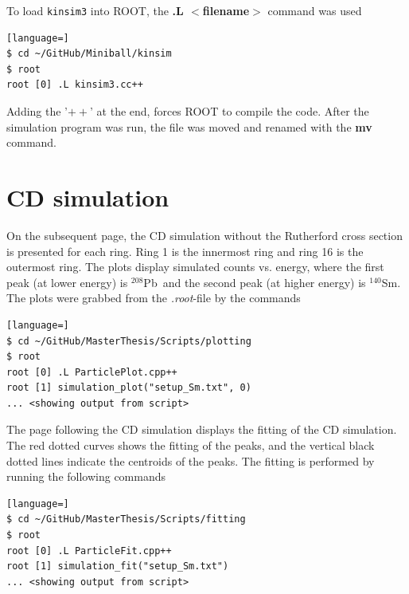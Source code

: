 \documentclass[twoside,english]{uiofysmaster/uiofysmaster}
\newcommand{\Sm}{$^{140}$Sm} %
\newcommand{\Pb}{$^{208}$Pb}
\begin{document}
\begin{appendices}
To load \texttt{kinsim3} into ROOT, the \textbf{.L $<$filename$>$} command was used
\begin{lstlisting}[language=]
$ cd ~/GitHub/Miniball/kinsim
$ root
root [0] .L kinsim3.cc++
\end{lstlisting}
Adding the '$++$' at the end, forces ROOT to compile the code. 
After the simulation program was run, the file was moved and renamed with the \textbf{mv} command. 


\section{CD simulation}
On the subsequent page, the CD simulation without the Rutherford cross section is presented for each ring. 
Ring 1 is the innermost ring and ring 16 is the outermost ring. 
The plots display simulated counts vs. energy, where the first peak (at lower energy) is \Pb\ and the second peak (at higher energy) is \Sm. 
The plots were grabbed from the \textit{.root}-file by the commands
\begin{lstlisting}[language=]
$ cd ~/GitHub/MasterThesis/Scripts/plotting
$ root
root [0] .L ParticlePlot.cpp++
root [1] simulation_plot("setup_Sm.txt", 0)
... <showing output from script>
\end{lstlisting}


The page following the CD simulation displays the fitting of the CD simulation. 
The red dotted curves shows the fitting of the peaks, and the vertical black dotted lines indicate the centroids of the peaks.
The fitting is performed by running the following commands
\begin{lstlisting}[language=]
$ cd ~/GitHub/MasterThesis/Scripts/fitting
$ root
root [0] .L ParticleFit.cpp++
root [1] simulation_fit("setup_Sm.txt")
... <showing output from script>
\end{lstlisting}



\end{appendices}
\end{document}
